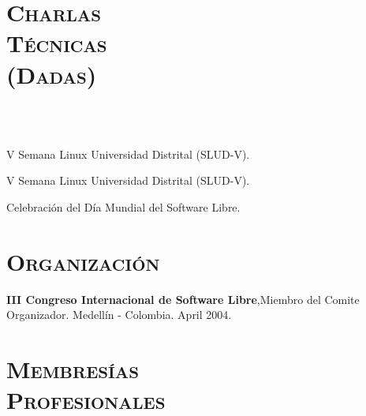 \begin{resume}
\section{\textsc{Charlas \\ T\'{e}cnicas \\ (Dadas)}}

\begin{formatb}
  \\
  \\
   \body
\end{formatb}

\begin{position}
V Semana Linux Universidad Distrital (SLUD-V).
\end{position}


\begin{position}
V Semana Linux Universidad Distrital (SLUD-V).
\end{position}


\begin{position}
Celebraci\'{o}n del D\'{i}a Mundial del Software Libre.
\end{position}
\newline
\newline
\newline



\section{\textsc{Organizaci\'{o}n}}
\employer{\textbf{}}
\dates{}
\textbf{III Congreso Internacional de Software Libre},Miembro del Comite Organizador. Medell\'{i}n - Colombia. April 2004.
\newline     


\section{\textsc{Membres\'{i}as\\ Profesionales}}


\end{resume}
